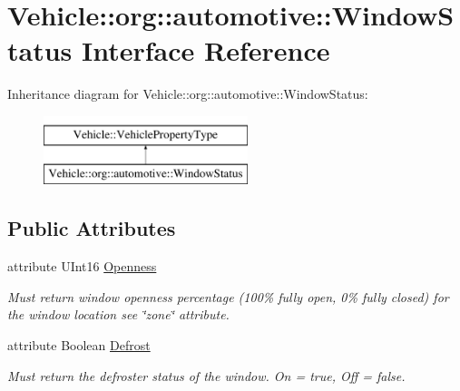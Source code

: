 \hypertarget{interfaceVehicle_1_1org_1_1automotive_1_1WindowStatus}{\section{Vehicle\-:\-:org\-:\-:automotive\-:\-:Window\-Status Interface Reference}
\label{interfaceVehicle_1_1org_1_1automotive_1_1WindowStatus}
}
Inheritance diagram for Vehicle\-:\-:org\-:\-:automotive\-:\-:Window\-Status\-:\begin{figure}[H]
\begin{center}
\leavevmode
\includegraphics[height=2.000000cm]{interfaceVehicle_1_1org_1_1automotive_1_1WindowStatus}
\end{center}
\end{figure}
\subsection*{Public Attributes}
\begin{DoxyCompactItemize}
\item 
attribute U\-Int16 \hyperlink{interfaceVehicle_1_1org_1_1automotive_1_1WindowStatus_a9b8341d77c516c81517a22728f5b74e5}{Openness}
\begin{DoxyCompactList}\small\item\em Must return window openness percentage (100\% fully open, 0\% fully closed) for the window location see \char`\"{}zone\char`\"{} attribute. \end{DoxyCompactList}\item 
attribute Boolean \hyperlink{interfaceVehicle_1_1org_1_1automotive_1_1WindowStatus_a57859718967ac3a49f7aa26bf6972826}{Defrost}
\begin{DoxyCompactList}\small\item\em Must return the defroster status of the window. On = true, Off = false. \end{DoxyCompactList}\end{DoxyCompactItemize}



